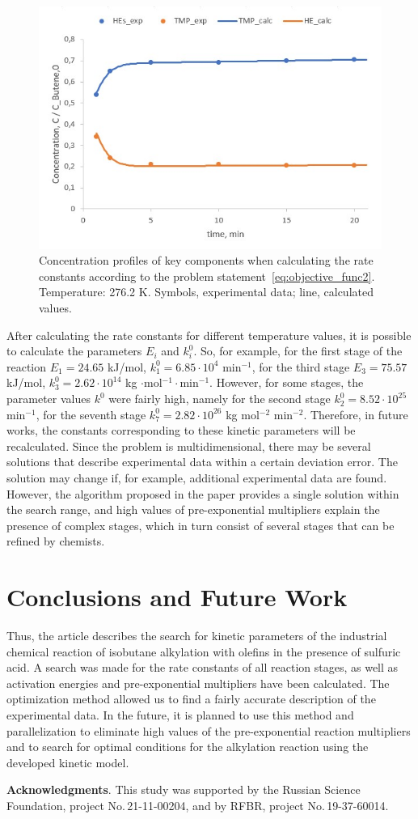 \documentclass{svproc}
\begin{document}
\begin{figure}
\begin{center}
  \includegraphics[width=0.7\linewidth]{res2.jpg}
  \caption{Concentration profiles of key components when calculating the rate constants according to the problem statement~\ref{eq:objective_func2}. Temperature: 276.2 K. Symbols, experimental data; line, calculated values.}
  \label{fig:res2}  
\end{center}
\end{figure}

After calculating the rate constants for different temperature values, it is possible to calculate the parameters $E_i$ and $k_i^0$. So, for example, for the first stage of the reaction $E_1 = 24.65$ kJ/mol, $k_1^0 = 6.85 \cdot 10^4$ min$^{-1}$, for the third stage $E_3 = 75.57$ kJ/mol, $k_3^0 = 2.62 \cdot 10^{14}$ kg $\cdot$mol$^{-1}\cdot$min$^{-1}$. However, for some stages, the parameter values $k^0$ were fairly high, namely for the second stage $k_2^0 = 8.52 \cdot 10^{25}$ min$^{-1}$, for the seventh stage $k_7^0 = 2.82 \cdot 10^{26}$ kg mol$^{-2}$ min$^{-2}$. Therefore, in future works, the constants corresponding to these kinetic parameters will be recalculated.
Since the problem is multidimensional, there may be several solutions that describe experimental data within a certain deviation error. The solution may change if, for example, additional experimental data are found. However, the algorithm proposed in the paper provides a single solution within the search range, and high values of pre-exponential multipliers explain the presence of complex stages, which in turn consist of several stages that can be refined by chemists.

\section{Conclusions and Future Work}
Thus, the article describes the search for kinetic parameters of the industrial chemical reaction of isobutane alkylation with olefins in the presence of sulfuric acid. A search was made for the rate constants of all reaction stages, as well as activation energies and pre-exponential multipliers have been calculated. The optimization method allowed us to find a fairly accurate description of the experimental data. In the future, it is planned to use this method and parallelization to eliminate high values of the pre-exponential reaction multipliers and to search for optimal conditions for the alkylation reaction using the developed kinetic model.

\medskip

\textbf{Acknowledgments}. This study was supported by the Russian Science Foundation, project No.\,21-11-00204, and by RFBR, project No.\,19-37-60014.

%
%

{}
\end{document}
